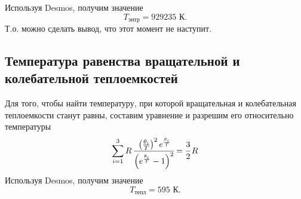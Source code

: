 Используя Desmos, получим значение
$$
T_{\text{энтр}} = 929235 \text{ К}.
$$
Т.о. можно сделать вывод, что этот момент не наступит.

\subsection{Температура равенства вращательной и колебательной теплоемкостей}
Для того, чтобы найти температуру, при которой вращательная и колебательная теплоемкости станут равны, составим уравнение и разрешим его относительно температуры
\begin{equation}
\sum\limits_{i=1}^3 R\, \cfrac{\left(\frac{\theta_i}{T}\right)^2e^{\frac{\theta_i}{T}}}{\left(e^{\frac{\theta_i}{T}}-1\right)^2} = \cfrac{3}{2}\,R
\end{equation}
Используя Desmos, получим значение
$$
T_{\text{тепл}} = 595 \text{ К}.
$$


